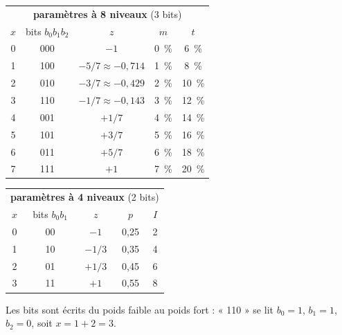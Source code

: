 \begin{center}
\renewcommand{\arraystretch}{1.15}
\small
\begin{tabular}{c c c c c}
\toprule
\multicolumn{5}{c}{\textbf{paramètres à 8 niveaux} (3 bits)} \\
$x$ & bits $b_0b_1b_2$ & $z$ & $m$ & $t$ \\
\midrule
0 & 000 & $-1$ & 0~\% & 6~\% \\
1 & 100 & $-5/7\approx-0{,}714$ & 1~\% & 8~\% \\
2 & 010 & $-3/7\approx-0{,}429$ & 2~\% & 10~\% \\
3 & 110 & $-1/7\approx-0{,}143$ & 3~\% & 12~\% \\
4 & 001 & $+1/7$ & 4~\% & 14~\% \\
5 & 101 & $+3/7$ & 5~\% & 16~\% \\
6 & 011 & $+5/7$ & 6~\% & 18~\% \\
7 & 111 & $+1$ & 7~\% & 20~\% \\
\bottomrule
\end{tabular}
\hspace{1cm}
\begin{tabular}{c c c c c}
\toprule
\multicolumn{5}{c}{\textbf{paramètres à 4 niveaux} (2 bits)} \\
$x$ & bits $b_0b_1$ & $z$ & $p$ & $I$ \\
\midrule
0 & 00 & $-1$ & 0,25 & 2 \\
1 & 10 & $-1/3$ & 0,35 & 4 \\
2 & 01 & $+1/3$ & 0,45 & 6 \\
3 & 11 & $+1$ & 0,55 & 8 \\
\bottomrule
\end{tabular}
\end{center}
Les bits sont écrits du poids faible au poids fort : « 110 » se lit $b_0=1$, $b_1=1$, $b_2=0$, soit $x=1+2=3$.

